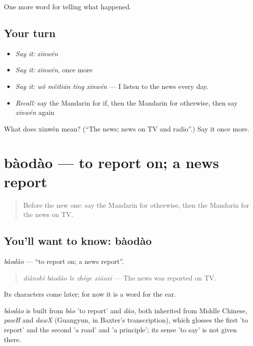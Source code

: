 \begin{grammarlens}[title={What you've built}]
One more word for telling what happened.
\end{grammarlens}

\subsection*{Your turn}
\begin{itemize}
\raggedright
  \item \emph{Say it:} \emph{xīnwén}
  \item \emph{Say it:} \emph{xīnwén}, once more
  \item \emph{Say it:} \emph{wǒ měitiān tīng xīnwén} — I listen to the news every day.
  \item \emph{Recall:} say the Mandarin for if, then the Mandarin for otherwise, then say \emph{xīnwén} again
\end{itemize}

\begin{tcolorbox}[breakable,colback=teal!4,colframe=teal!35!black,title={Before you move on}]
What does xīnwén mean? (\textquotedblleft{}The news; news on TV and radio\textquotedblright{}.) Say it once more.
\end{tcolorbox}
\section[bàodào]{bàodào — to report on; a news report}

\label{lesson:ZH-C290-baodao}



\begin{quote}
Before the new one: say the Mandarin for otherwise, then the Mandarin for the news on TV.
\end{quote}

\subsection*{You'll want to know: bàodào}
\emph{bàodào} — \textquotedblleft{}to report on; a news report\textquotedblright{}.

\begin{quote}
\emph{diànshì bàodào le zhège xiāoxi} — The news was reported on TV.
\end{quote}

Its characters come later; for now it is a word for the ear.

\begin{cousinweb}
\emph{bàodào} is built from \emph{bào} 'to report' and \emph{dào}, both inherited from Middle Chinese, \emph{pawH} and \emph{dawX} (Guangyun, in Baxter's transcription), which glosses the first 'to report' and the second 'a road' and 'a principle'; its sense 'to say' is not given there.
\end{cousinweb}

